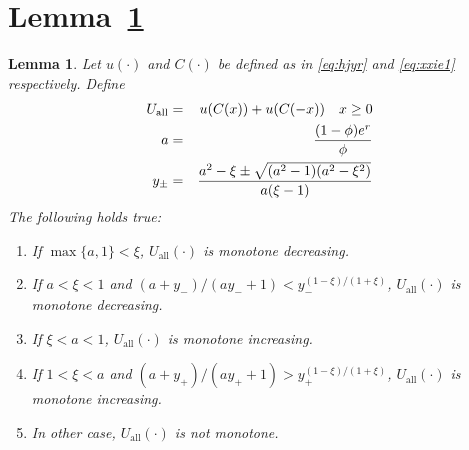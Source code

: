 \documentclass[11pt,a4]{amsart}
\newtheorem{lemma}{Lemma}[section]
\newcommand{\1}{{\mathbf 1}}
\begin{document}
\section{Lemma~\ref{lemma:III}}
\setcounter{equation}{0}
\begin{lemma}\label{lemma:III}
Let $u(\cdot)$  and $C(\cdot)$ be defined as in \eqref{eq:hjyr} and
\eqref{eq:xxie1} respectively. Define
\begin{eqnarray*}
U_{\text{all}} &=& u(C(x))
+ u(C(-x))
\quad
x \geq 0 \\
a &=& {
  (1 - \phi) e^r
  \over
  \phi
} \\
y_\pm &=& {
  a^2 - \xi \pm \sqrt{(a^2 - 1) (a^2 - \xi^2)}
  \over
  a (\xi - 1)
}
\end{eqnarray*}
The following holds true:
\begin{enumerate}
\item If $\max\{a, 1\} < \xi$, $U_{\text{all}}(\cdot)$ is
  monotone decreasing.
\item If $a < \xi < 1$ and $(a + y_-)/(a y_- + 1) <
  y_-^{(1-\xi)/(1+\xi)}$, $U_{\text{all}}(\cdot)$ is monotone
  decreasing.
\item If $\xi < a < 1$, $U_{\text{all}}(\cdot)$ is monotone
  increasing.
\item If $1 < \xi < a$ and $(a + y_+)/(a y_+ + 1) >
  y_+^{(1-\xi)/(1+\xi)}$, $U_{\text{all}}(\cdot)$ is monotone
  increasing.
\item In other case, $U_{\text{all}}(\cdot)$ is not monotone.
\end{enumerate}
\end{lemma}
\end{document}
